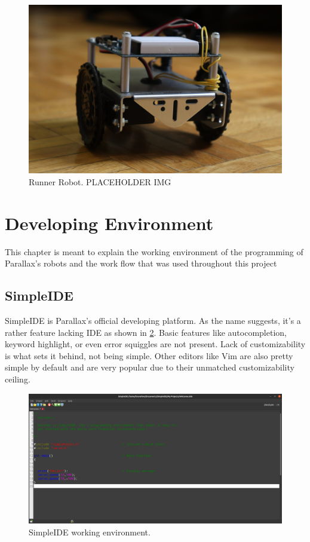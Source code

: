 \documentclass[sigconf,nonacm]{acmart}
\begin{document}
\begin{figure}[h]
    \centering
    \includegraphics[scale=0.1]{resources/Runner_robot.jpeg}
    \caption{\label{fig:Runner}Runner Robot. PLACEHOLDER IMG}
\end{figure}

\section{Developing Environment}

      This chapter is meant to explain the working environment of the
      programming
      of Parallax's robots and the work flow that was used throughout this
      project
      

      \subsection{SimpleIDE}

      SimpleIDE is Parallax's official developing platform. As the name
      suggests, it's a rather feature lacking IDE as shown in \ref{fig:simple_ide}. Basic features like autocompletion, keyword highlight, or even
      error squiggles are not present. Lack of customizability is what sets it
      behind, not being simple. Other editors like Vim are also pretty simple by
      default and are very popular due to their unmatched customizability ceiling. 
      \begin{figure}[h]
            \centering
            \includegraphics[scale=0.1]{resources/simple_ide.png}
            \caption{\label{fig:simple_ide}SimpleIDE working environment.}
      \end{figure}
\end{document}
